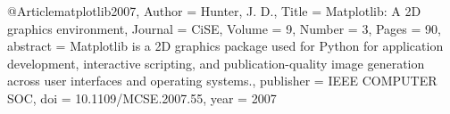 
@Article{matplotlib2007,
  Author    = {Hunter, J. D.},
  Title     = {Matplotlib: A 2D graphics environment},
  Journal   = {CiSE},
  Volume    = {9},
  Number    = {3},
  Pages     = {90},
  abstract  = {Matplotlib is a 2D graphics package used for Python
  for application development, interactive scripting, and
  publication-quality image generation across user
  interfaces and operating systems.},
  publisher = {IEEE COMPUTER SOC},
  doi       = {10.1109/MCSE.2007.55},
  year      = 2007
}
